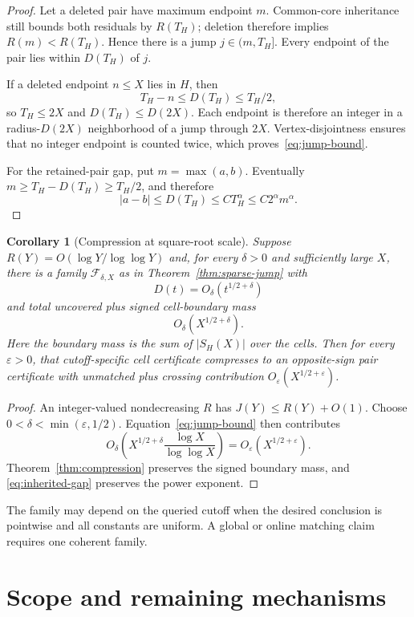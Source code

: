 \documentclass[11pt,a4paper]{amsart}
\newtheorem{corollary}[theorem]{Corollary}
\theoremstyle{definition}
\theoremstyle{remark}
\begin{document}
\begin{proof}
Let a deleted pair have maximum endpoint $m$.  Common-core inheritance still
bounds both residuals by $R(T_H)$; deletion therefore implies
$R(m)<R(T_H)$.  Hence there is a jump $j\in(m,T_H]$.  Every endpoint of the
pair lies within $D(T_H)$ of $j$.

If a deleted endpoint $n\leq X$ lies in $H$, then
\[
 T_H-n\leq D(T_H)\leq T_H/2,
\]
so $T_H\leq2X$ and $D(T_H)\leq D(2X)$.  Each endpoint is therefore an
integer in a radius-$D(2X)$ neighborhood of a jump through $2X$.
Vertex-disjointness ensures that no integer endpoint is counted twice, which
proves~\eqref{eq:jump-bound}.

For the retained-pair gap, put $m=\max(a,b)$.  Eventually
$m\geq T_H-D(T_H)\geq T_H/2$, and therefore
\[
 |a-b|\leq D(T_H)\leq CT_H^\alpha\leq C2^\alpha m^\alpha.
\]
\end{proof}

\begin{corollary}[Compression at square-root scale]\label{cor:compression}
Suppose $R(Y)=O(\log Y/\log\log Y)$ and, for every $\delta>0$ and
sufficiently large $X$, there is a family $\mathcal F_{\delta,X}$ as in
Theorem~\ref{thm:sparse-jump} with
\[
 D(t)=O_\delta(t^{1/2+\delta})
\]
and total uncovered plus signed cell-boundary mass
\[
 O_\delta(X^{1/2+\delta}).
\]
Here the boundary mass is the sum of $|S_H(X)|$ over the cells.  Then for
every $\varepsilon>0$, that cutoff-specific cell certificate compresses to an
opposite-sign pair certificate with unmatched plus crossing contribution
$O_\varepsilon(X^{1/2+\varepsilon})$.
\end{corollary}

\begin{proof}
An integer-valued nondecreasing $R$ has $J(Y)\leq R(Y)+O(1)$.  Choose
$0<\delta<\min(\varepsilon,1/2)$.  Equation~\eqref{eq:jump-bound} then
contributes
\[
 O_\delta\!\left(X^{1/2+\delta}
 \frac{\log X}{\log\log X}\right)
 =O_\varepsilon(X^{1/2+\varepsilon}).
\]
Theorem~\ref{thm:compression} preserves the signed boundary mass, and
\eqref{eq:inherited-gap} preserves the power exponent.
\end{proof}

The family may depend on the queried cutoff when the desired conclusion is
pointwise and all constants are uniform.  A global or online matching claim
requires one coherent family.

\section{Scope and remaining mechanisms}
\end{document}

